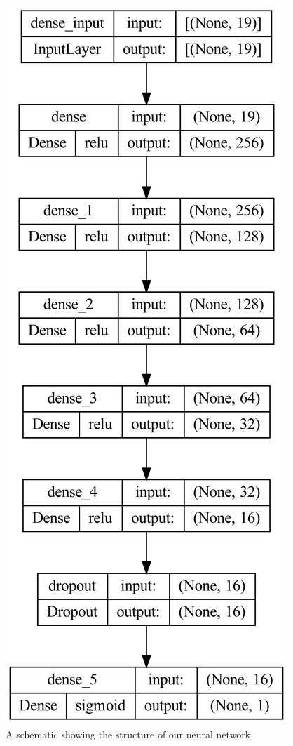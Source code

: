 \documentclass[
  letterpaper,
  DIV=11,
  numbers=noendperiod]{scrartcl}
\begin{document}
\begin{figure}[H]

{\centering \includegraphics{earth-science-ai-shrubland_files/figure-pdf/fig-model-output-1.png}

}

\caption{\label{fig-model}A schematic showing the structure of our
neural network.}

\end{figure}
\end{document}
